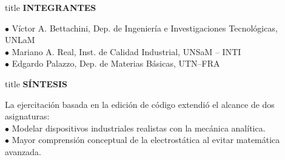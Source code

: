 \documentclass[aspectratio=169]{beamer} %
\begin{document}
\begin{frame}[plain] 
 
	\vspace{0.1cm}
	
  \vspace{0.1cm}

	\begin{beamercolorbox}[wd=0.21\textwidth,sep=0pt,center,rounded=true,shadow=true]{title}
     {\normalsize\textbf{INTEGRANTES }}
  \end{beamercolorbox}
 	
	\vspace{-0.3cm}
 
	\begin{flushleft}
	$\bullet$ Víctor A. Bettachini, Dep. de Ingeniería e Investigaciones Tecnológicas, UNLaM
	\\
	$\bullet$ Mariano A. Real, Inst. de Calidad Industrial, UNSaM -- INTI
	\\
	$\bullet$ Edgardo Palazzo, Dep. de Materias Básicas, UTN--FRA
  \end{flushleft}

  \vspace{0.1cm}

  \begin{beamercolorbox}[wd=0.21\textwidth,sep=0pt,center,rounded=true,shadow=true]{title}
     {\normalsize\textbf{SÍNTESIS }}
  \end{beamercolorbox}

	\vspace{-0.3cm}

	\begin{flushleft}
	La ejercitación basada en la edición de código extendió el alcance de dos asignaturas:
	\\
	$\bullet$ Modelar dispositivos industriales realistas con la mecánica analítica.\\ 
	$\bullet$ Mayor comprensión conceptual de la electrostática al evitar matemática avanzada. 
  \end{flushleft}


\end{frame}
\end{document}
